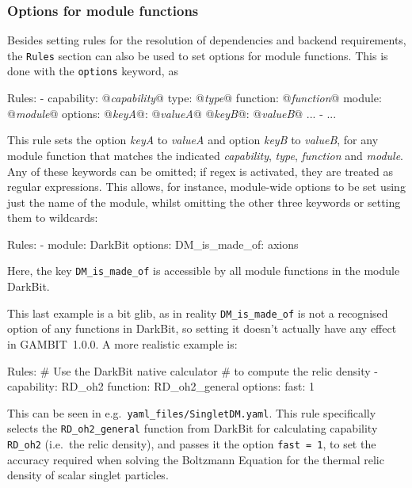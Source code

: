 \documentclass[pdftex,twocolumn,epjc3_preprint,runningheads]{svjour3}
\renewcommand{\_}{\discretionary{\underscore}{}{\underscore}}
\newcommand\cpp[1]{{\lstinline!#1!}}  %
\newcommand\yaml[1]{{\lstset{style=yaml}\lstinline!#1!\lstset{style=cpp}}}
\newcommand\yamlvalue[1]{{\YAMLvaluestyle\ttfamily#1}}
\newcommand\term[1]{{\lstset{style=terminal}\lstinline!#1!\lstset{style=cpp}}}
\newcommand\YAMLvaluestyle{\footnotesize\color{blue}\mdseries}
\newcommand{\metavarf}[1]{\textit{\color{darkgreen}\footnotesize\textrm{#1}}}
\newcommand{\metavar}{\metavarf}
\newcommand{\gambit}{\textsf{GAMBIT}\xspace}
\newcommand{\darkbit}{\textsf{DarkBit}\xspace}
\newcommand{\GB}{\gambit}
\begin{document}
\subsubsection{Options for module functions}
\label{rules_options}

Besides setting rules for the resolution of dependencies and backend requirements, the \yaml{Rules} section can also be used to set options for module functions.  This is done with the \yaml{options} keyword, as
%
\begin{lstyaml}
Rules:
  - capability: @\metavar{capability}@
    type: @\metavar{type}@
    function: @\metavar{function}@
    module: @\metavar{module}@
    options:
      @\metavar{key\_A}@: @\metavar{value\_A}@
      @\metavar{key\_B}@: @\metavar{value\_B}@
      ...
  - ...
\end{lstyaml}
This rule sets the option \metavar{key\_A} to \metavar{value\_A} and option \metavar{key\_B} to \metavar{value\_B}, for any module function
that matches the indicated \metavar{capability}, \metavar{type},
\metavar{function} and \metavar{module}.  Any of these keywords can be omitted; if
regex is activated, they are treated as regular expressions.  This allows, for
instance, module-wide options to be set using just the name of the module,
whilst omitting the other three keywords or setting them to wildcards:
%
\begin{lstyaml}
Rules:
  - module: DarkBit
    options:
      DM_is_made_of: axions
\end{lstyaml}
%
Here, the key \yaml{DM_is_made_of} is accessible by all module functions
in the module \yamlvalue{DarkBit}.

This last example is a bit glib, as in reality \yaml{DM_is_made_of} is not a recognised option of any functions in \darkbit, so
setting it doesn't actually have any effect in \GB\ \textsf{1.0.0}.  A more realistic example is:
\begin{lstyaml}
Rules:
  # Use the DarkBit native calculator
  # to compute the relic density
  - capability: RD_oh2
    function: RD_oh2_general
    options:
      fast: 1
\end{lstyaml}
This can be seen in e.g.\ \term{yaml_files/SingletDM.yaml}.  This rule specifically selects the \cpp{RD_oh2_general} function from \darkbit for calculating capability \cpp{RD_oh2} (i.e.\ the relic density), and passes it the option \cpp{fast = 1}, to set the accuracy required when solving the Boltzmann Equation for the thermal relic density of scalar singlet particles.
\end{document}
